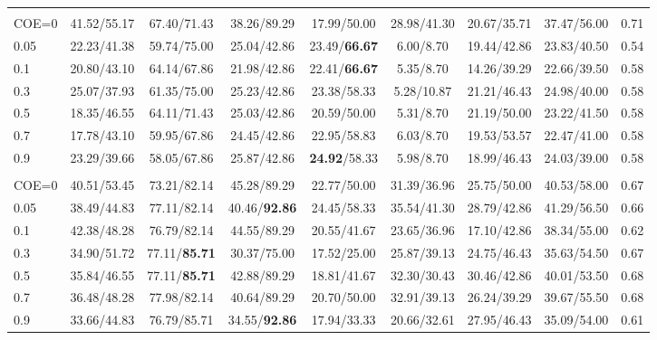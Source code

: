 \begin{table}[t]
\begin{tabular}{@{}lcccccccc@{}}
\rowcolor{gray!15}
\multicolumn{9}{@{}l@{}}{\textbf{\textbf{BudgetMem-\textsc{Imp}} (COE)}} \\
COE=0   & 41.52/55.17 & 67.40/71.43 & 38.26/89.29 & 17.99/50.00 & 28.98/41.30 & 20.67/35.71 & 37.47/56.00 & 0.71 \\
0.05    & 22.23/41.38 & 59.74/75.00 & 25.04/42.86 & 23.49/\textbf{66.67} & 6.00/8.70   & 19.44/42.86 & 23.83/40.50 & 0.54 \\
0.1     & 20.80/43.10 & 64.14/67.86 & 21.98/42.86 & 22.41/\textbf{66.67} & 5.35/8.70   & 14.26/39.29 & 22.66/39.50 & 0.58 \\
0.3     & 25.07/37.93 & 61.35/75.00 & 25.23/42.86 & 23.38/58.33 & 5.28/10.87  & 21.21/46.43 & 24.98/40.00 & 0.58 \\
0.5     & 18.35/46.55 & 64.11/71.43 & 25.03/42.86 & 20.59/50.00 & 5.31/8.70   & 21.19/50.00 & 23.22/41.50 & 0.58 \\
0.7     & 17.78/43.10 & 59.95/67.86 & 24.45/42.86 & 22.95/58.83 & 6.03/8.70   & 19.53/53.57 & 22.47/41.00 & 0.58 \\
0.9     & 23.29/39.66 & 58.05/67.86 & 25.87/42.86 & \textbf{24.92}/58.33 & 5.98/8.70   & 18.99/46.43 & 24.03/39.00 & 0.58 \\
\midrule

\rowcolor{gray!15}
\multicolumn{9}{@{}l@{}}{\textbf{\textbf{BudgetMem-\textsc{Rea}} (COE)}} \\
COE=0   & 40.51/53.45 & 73.21/82.14 & 45.28/89.29 & 22.77/50.00 & 31.39/36.96 & 25.75/50.00 & 40.53/58.00 & 0.67 \\
0.05    & 38.49/44.83 & 77.11/82.14 & 40.46/\textbf{92.86} & 24.45/58.33 & 35.54/41.30 & 28.79/42.86 & 41.29/56.50 & 0.66 \\
0.1     & 42.38/48.28 & 76.79/82.14 & 44.55/89.29 & 20.55/41.67 & 23.65/36.96 & 17.10/42.86 & 38.34/55.00 & 0.62 \\
0.3     & 34.90/51.72 & 77.11/\textbf{85.71} & 30.37/75.00 & 17.52/25.00 & 25.87/39.13 & 24.75/46.43 & 35.63/54.50 & 0.67 \\
0.5     & 35.84/46.55 & 77.11/\textbf{85.71} & 42.88/89.29 & 18.81/41.67 & 32.30/30.43 & 30.46/42.86 & 40.01/53.50 & 0.68 \\
0.7     & 36.48/48.28 & 77.98/82.14 & 40.64/89.29 & 20.70/50.00 & 32.91/39.13 & 26.24/39.29 & 39.67/55.50 & 0.68 \\
0.9     & 33.66/44.83 & 76.79/85.71 & 34.55/\textbf{92.86} & 17.94/33.33 & 20.66/32.61 & 27.95/46.43 & 35.09/54.00 & 0.61 \\
\midrule


\end{tabular}
\end{table}
